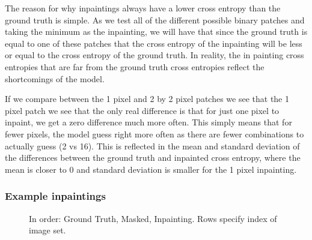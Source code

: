 \documentclass{article}
\begin{document}
\begin{enumerate}
    The reason for why inpaintings always have a lower cross entropy than the
    ground truth is simple. As we test all of the different possible binary
    patches and taking the minimum as the inpainting, we will have that since
    the ground truth is equal to one of these patches that the cross entropy of
    the inpainting will be less or equal to the cross entropy of the ground
    truth. In reality, the in painting cross entropies that are far from the
    ground truth cross entropies reflect the shortcomings of the model.

    If we compare between the 1 pixel and 2 by 2 pixel patches we see that the 1
    pixel patch we see that the only real difference is that for just one pixel
    to inpaint, we get a zero difference much more often. This simply means that
    for fewer pixels, the model guess right more often as there are fewer
    combinations to actually guess (2 vs 16). This is reflected in the mean and
    standard deviation of the differences between the ground truth and inpainted
    cross entropy, where the mean is closer to 0 and standard deviation is
    smaller for the 1 pixel inpainting.

    \subsubsection{Example inpaintings}

    \begin{figure}[H]
      \centering
      \caption{In order: Ground Truth, Masked, Inpainting. Rows specify index of
      image set.}
    \end{figure}


\end{enumerate}
\end{document}
